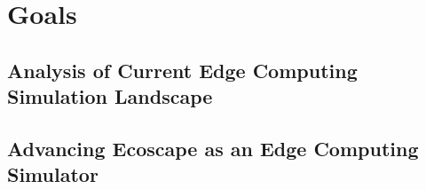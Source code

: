 \chapter{Goals}
\section{Analysis of Current Edge Computing Simulation Landscape}
\section{Advancing Ecoscape as an Edge Computing Simulator}